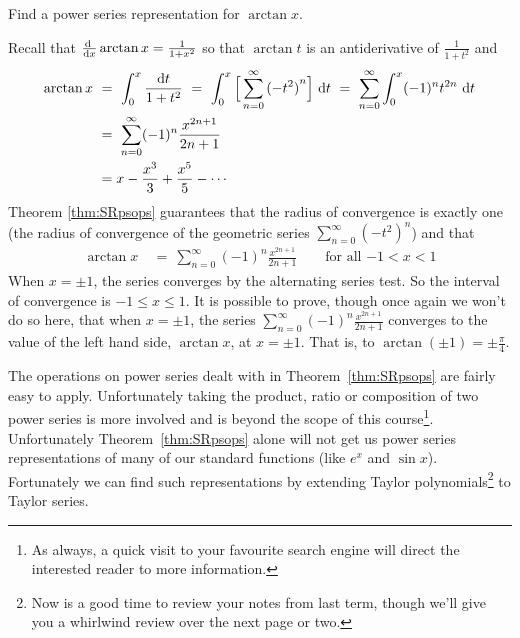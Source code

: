 \begin{eg}[$\arctan x$]\label{eg:SRpsrepD}
Find a power series representation for $\arctan x$.

\soln
Recall that $\diff{}{x}\arctan x = \frac{1}{1+x^2}$ so that
$\arctan t$ is an antiderivative of $\frac{1}{1+t^2}$ and
\begin{align*}
\arctan x\ &=\ \int_0^x \frac{\dee{t}}{1+t^2}
             \ =\  \int_0^x\Big[\sum_{n=0}^\infty {(-t^2)}^n\Big]\ \dee{t}
             \ =\  \sum_{n=0}^\infty \int_0^x (-1)^n t^{2n}\ \dee{t} \\
             &=\ \sum_{n=0}^\infty (-1)^n\frac{x^{2n+1}}{2n+1} \\
             &=x -\frac{x^3}{3} +\frac{x^5}{5}-\cdots
\end{align*}
Theorem \ref{thm:SRpsops} guarantees that the radius of convergence is
exactly one (the radius of convergence of the geometric series
$\sum_{n=0}^\infty (-t^2)^n$) and that
\begin{align*}
\arctan x\ &=\ \sum_{n=0}^\infty (-1)^n\frac{x^{2n+1}}{2n+1}
\qquad\text{for all $-1<x<1$}
\end{align*}
When $x=\pm 1$, the series converges by the alternating series test.
So the interval of convergence is $-1\le x\le 1$.
It is possible to prove, though once again we won't do so here,
that when $x=\pm 1$, the series
$\sum_{n=0}^\infty (-1)^n\frac{x^{2n+1}}{2n+1}$
converges to the value of the left hand side, $\arctan x$, at $x=\pm 1$.
That is, to $\arctan(\pm 1)=\pm \frac{\pi}{4}$.
\end{eg}

The operations on power series dealt with in Theorem~\ref{thm:SRpsops}
are fairly easy to apply. Unfortunately taking the product, ratio
or composition of two power series is more involved and is beyond
the scope of this course\footnote{As always, a quick visit to your
favourite search engine will direct the interested reader to more information.}.
Unfortunately Theorem~\ref{thm:SRpsops} alone will not get us
power series representations of many of our standard  functions
(like  $e^x$ and $\sin x$).  Fortunately we can find such
representations by extending Taylor polynomials\footnote{Now is a good
time to review your notes from last term, though  we'll give you a
whirlwind review over the next page or two.} to Taylor series.


